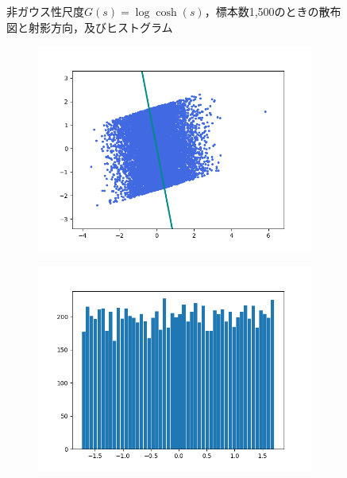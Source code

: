 \documentclass[class=jsarticle, crop=false, dvipdfmx, fleqn]{standalone}
\begin{document}
\begin{figure}
\begin{minipage}{0.45\linewidth}
\begin{figure}[H]
            \label{fig:logcosh_n1500_hist}
        \end{figure}
    \end{minipage}
    \caption{非ガウス性尺度\(G(s) = \log\cosh(s)\)，標本数1,500のときの散布図と射影方向，及びヒストグラム}
    \label{fig:logcosh_n1500}
\end{figure}

\begin{figure}
	\centering
    \begin{minipage}{0.45\linewidth}
        \begin{figure}[H]
        	   \centering
            \includegraphics[clip, width=\linewidth]{../figures/assignment2_result_logcosh_n10000_scatter.png}
            \label{fig:logcosh_n10000_scatter}
        \end{figure}
    \end{minipage}
    \begin{minipage}{0.45\linewidth}
        \begin{figure}[H]
            \centering
            \includegraphics[clip, width=\linewidth]{../figures/assignment2_result_logcosh_n10000_hist.png}

\end{figure}
\end{minipage}
\end{figure}
\end{document}
